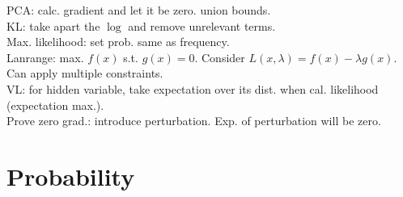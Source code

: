 PCA: calc. gradient and let it be zero. union bounds.\\
KL: take apart the $\log$ and remove unrelevant terms.\\
Max. likelihood: set prob. same as frequency.\\
Lanrange: max. $f(x)$ s.t. $g(x)=0$. Consider $L(x, \lambda) = f(x) - \lambda g(x)$. Can apply multiple constraints.\\
VL: for hidden variable, take expectation over its dist. when cal. likelihood (expectation max.).\\
Prove zero grad.: introduce perturbation. Exp. of perturbation will be zero.

\section{Probability}

